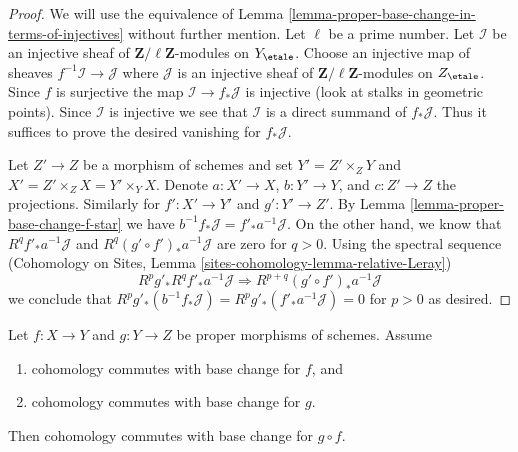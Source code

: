 \begin{proof}
We will use the equivalence of
Lemma \ref{lemma-proper-base-change-in-terms-of-injectives}
without further mention. Let $\ell$ be a prime number.
Let $\mathcal{I}$ be an injective sheaf of
$\mathbf{Z}/\ell\mathbf{Z}$-modules on $Y_\etale$.
Choose an injective map of sheaves $f^{-1}\mathcal{I} \to \mathcal{J}$
where $\mathcal{J}$ is an injective sheaf of
$\mathbf{Z}/\ell\mathbf{Z}$-modules on $Z_\etale$.
Since $f$ is surjective the map $\mathcal{I} \to f_*\mathcal{J}$
is injective (look at stalks in geometric points).
Since $\mathcal{I}$ is injective we see that $\mathcal{I}$
is a direct summand of $f_*\mathcal{J}$. Thus it suffices
to prove the desired vanishing for $f_*\mathcal{J}$.

\medskip\noindent
Let $Z' \to Z$ be a morphism of schemes and set
$Y' = Z' \times_Z Y$ and $X' = Z' \times_Z X = Y' \times_ Y X$.
Denote $a : X' \to X$, $b : Y' \to Y$, and $c : Z' \to Z$ the
projections. Similarly for $f' : X' \to Y'$ and $g' : Y' \to Z'$.
By Lemma \ref{lemma-proper-base-change-f-star} we have
$b^{-1}f_*\mathcal{J} = f'_*a^{-1}\mathcal{J}$.
On the other hand, we know that $R^qf'_*a^{-1}\mathcal{J}$ and
$R^q(g' \circ f')_*a^{-1}\mathcal{J}$ are zero for $q > 0$.
Using the spectral sequence
(Cohomology on Sites, Lemma \ref{sites-cohomology-lemma-relative-Leray})
$$
R^pg'_* R^qf'_* a^{-1}\mathcal{J} \Rightarrow
R^{p + q}(g' \circ f')_* a^{-1}\mathcal{J}
$$
we conclude that
$ R^pg'_*(b^{-1}f_*\mathcal{J}) = R^pg'_*(f'_*a^{-1}\mathcal{J}) = 0$
for $p > 0$ as desired.
\end{proof}

\begin{lemma}
\label{lemma-composition}
Let $f : X \to Y$ and $g : Y \to Z$ be proper morphisms of schemes. Assume
\begin{enumerate}
\item cohomology commutes with base change for $f$, and
\item cohomology commutes with base change for $g$.
\end{enumerate}
Then cohomology commutes with base change for $g \circ f$.
\end{lemma}

